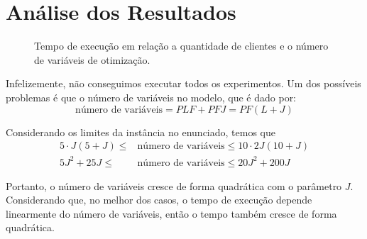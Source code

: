 \section{Análise dos Resultados}

    \begin{figure}[H]
        \centering
        \caption{Tempo de execução em relação a quantidade de clientes e o número de variáveis de otimização.}

    \end{figure}

    Infelizemente, não conseguimos executar todos os experimentos. Um dos possíveis problemas é que o número de variáveis no modelo, que é dado por:
    \[
        \text{número de variáveis} = P L F + P F J = P F (L + J)
    \]

    Considerando os limites da instância no enunciado, temos que
    \begin{align*}
        5 \cdot J (5 + J) \leq &\text{número de variáveis} \leq 10 \cdot 2 J (10 + J) \\
        5 J^2 + 25 J \leq &\text{número de variáveis} \leq 20 J^2 + 200 J
    \end{align*}

    Portanto, o número de variáveis cresce de forma quadrática com o parâmetro $J$. Considerando que, no melhor dos casos, o tempo de execução depende linearmente do número de variáveis, então o tempo também cresce de forma quadrática.
